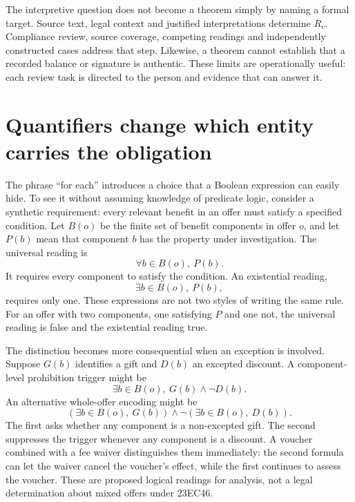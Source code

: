 \documentclass[12pt,a4paper,oneside,openany]{book}
\begin{document}
The interpretive question does not become a theorem simply by naming a formal
target. Source text, legal context and justified interpretations determine
$R_v$. Compliance review, source coverage, competing readings and independently
constructed cases address that step. Likewise, a theorem cannot establish that
a recorded balance or signature is authentic. These limits are operationally
useful: each review task is directed to the person and evidence that can answer it.

\section{Quantifiers change which entity carries the obligation}
\label{merge:M03:01}


The phrase ``for each'' introduces a choice that a Boolean expression can easily
hide. To see it without assuming knowledge of predicate logic, consider a
synthetic requirement: every relevant benefit in an offer must satisfy a specified
condition. Let $B(o)$ be the finite set of benefit components in offer $o$, and
let $P(b)$ mean that component $b$ has the property under investigation. The
universal reading is
\begin{equation}
 \forall b\in B(o),\ P(b).
 \label{eq:universal-benefit}
\end{equation}
It requires every component to satisfy the condition. An existential reading,
\begin{equation}
 \exists b\in B(o),\ P(b),
 \label{eq:existential-benefit}
\end{equation}
requires only one. These expressions are not two styles of writing the same rule.
For an offer with two components, one satisfying $P$ and one not, the universal
reading is false and the existential reading true.

The distinction becomes more consequential when an exception is involved. Suppose
$G(b)$ identifies a gift and $D(b)$ an excepted discount. A component-level
prohibition trigger might be
\begin{equation}
 \exists b\in B(o),\ G(b)\land\neg D(b).
 \label{eq:component-exception}
\end{equation}
An alternative whole-offer encoding might be
\begin{equation}
 \left(\exists b\in B(o),\ G(b)\right)
 \land\neg\left(\exists b\in B(o),\ D(b)\right).
 \label{eq:offer-exception}
\end{equation}
The first asks whether any component is a non-excepted gift. The second suppresses
the trigger whenever any component is a discount. A voucher combined with a fee
waiver distinguishes them immediately: the second formula can let the waiver
cancel the voucher's effect, while the first continues to assess the voucher.
These are proposed logical readings for analysis, not a legal determination about
mixed offers under 23EC46.
\end{document}
